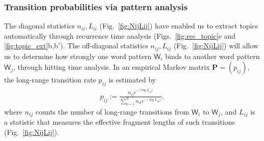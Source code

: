 \documentclass[10pt,journal,compsoc]{IEEEtran}
\begin{document}
\subsubsection{Transition probabilities via pattern analysis}The diagonal statistics $ n_{ii},L_{ii}$ (Fig.~\ref{fig:NijLij}) have enabled us to extract topics automatically through recurrence time analysis (Figs.~\ref{fig:rec_topic}e and \ref{fig:topic_ext}b,b$'$). The off-diagonal statistics  $ n_{ij},L_{ij}$ (Fig.~\ref{fig:NijLij})  will allow us to determine how strongly one word pattern $ \mathsf W_i$ binds to another word pattern $\mathsf W_j $, through hitting time analysis. In an empirical Markov matrix $  \mathbf{ P}=( p_{ij})$,  the long-range transition rate $ p_{ij}$ is estimated by \begin{align} p_{ij}:=\frac{n_{ij}e^{-\langle\log L_{ij}\rangle}}{\displaystyle\sum_{k=1}^Nn_{ik}e^{-\langle\log L_{ik}\rangle}},\label{eq:pij_est}
\end{align}where $ n_{ij}$ counts the number of long-range transitions from $ \mathsf  W_i$ to $\mathsf  W_j $, and $ L_{ij}$ is a statistic that measures the effective fragment lengths of such transitions (Fig.~\ref{fig:NijLij}).
\end{document}
